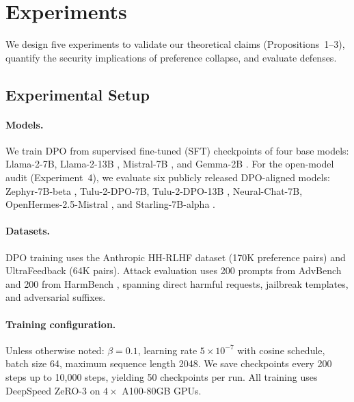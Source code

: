 
\section{Experiments}
\label{sec:experiments}

We design five experiments to validate our theoretical claims (Propositions~1--3), quantify the security implications of preference collapse, and evaluate defenses.

\subsection{Experimental Setup}
\label{sec:setup}

\paragraph{Models.} We train DPO from supervised fine-tuned (SFT) checkpoints of four base models: Llama-2-7B, Llama-2-13B \citep{touvron2023llama}, Mistral-7B \citep{jiang2023mistral}, and Gemma-2B \citep{team2024gemma}. For the open-model audit (Experiment~4), we evaluate six publicly released DPO-aligned models: Zephyr-7B-beta \citep{tunstall2023zephyr}, Tulu-2-DPO-7B, Tulu-2-DPO-13B \citep{ivison2023camels}, Neural-Chat-7B, OpenHermes-2.5-Mistral \citep{teknium2023openhermes}, and Starling-7B-alpha \citep{zhu2023starling}.

\paragraph{Datasets.} DPO training uses the Anthropic HH-RLHF dataset \citep{bai2022training} (170K preference pairs) and UltraFeedback \citep{cui2023ultrafeedback} (64K pairs). Attack evaluation uses 200 prompts from AdvBench \citep{zou2023universal} and 200 from HarmBench \citep{mazeika2024harmbench}, spanning direct harmful requests, jailbreak templates, and adversarial suffixes.

\paragraph{Training configuration.} Unless otherwise noted: $\beta = 0.1$, learning rate $5 \times 10^{-7}$ with cosine schedule, batch size 64, maximum sequence length 2048. We save checkpoints every 200 steps up to 10{,}000 steps, yielding 50 checkpoints per run. All training uses DeepSpeed ZeRO-3 on $4 \times$ A100-80GB GPUs.

